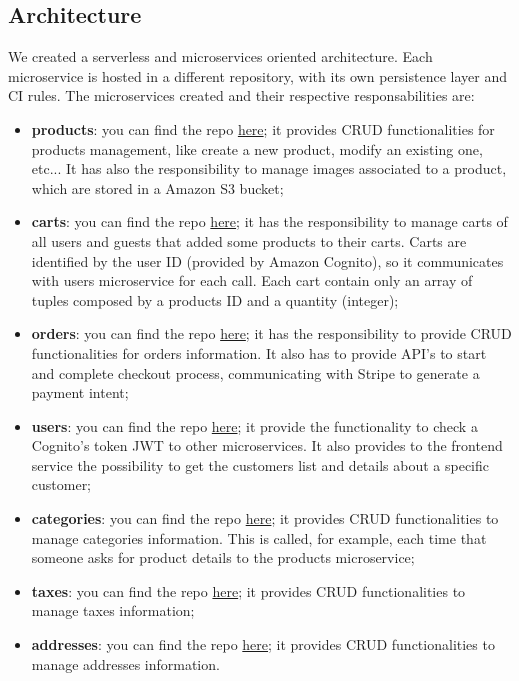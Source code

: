 \subsection{Architecture}\label{_architecture}
We created a serverless and microservices oriented architecture. Each microservice is hosted in a different repository, with its own persistence layer and CI rules.
The microservices created and their respective responsabilities are:
\begin{itemize}
    \item \textbf{products}: you can find the repo \href{https://github.com/SWException/products}{here}; it provides CRUD functionalities for products management,
          like create a new product, modify an existing one, etc... It has also the responsibility to manage images associated to a product, which are
          stored in a Amazon S3 bucket;
    \item \textbf{carts}: you can find the repo \href{https://github.com/SWException/carts}{here}; it has the responsibility to manage carts of all users and guests that
          added some products to their carts. Carts are identified by the user ID (provided by Amazon Cognito), so it communicates with users microservice for each call.
          Each cart contain only an array of tuples composed by a products ID and a quantity (integer);
    \item \textbf{orders}: you can find the repo \href{https://github.com/SWException/orders}{here}; it has the responsibility to provide CRUD functionalities for orders information.
          It also has to provide API's to start and complete checkout process, communicating with Stripe to generate a payment intent;
    \item \textbf{users}: you can find the repo \href{https://github.com/SWException/users}{here}; it provide the functionality to check a Cognito's token JWT to other microservices.
          It also provides to the frontend service the possibility to get the customers list and details about a specific customer;
    \item \textbf{categories}: you can find the repo \href{https://github.com/SWException/categories}{here}; it provides CRUD functionalities to manage categories information.
          This is called, for example, each time that someone asks for product details to the products microservice;
    \item \textbf{taxes}: you can find the repo \href{https://github.com/SWException/taxes}{here}; it provides CRUD functionalities to manage taxes information;
    \item \textbf{addresses}: you can find the repo \href{https://github.com/SWException/addresses}{here}; it provides CRUD functionalities to manage addresses information.
\end{itemize}


